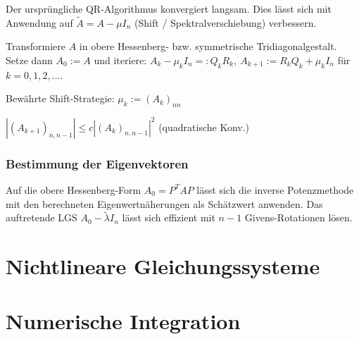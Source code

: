 Der ursprüngliche QR-Algorithmus konvergiert langsam. Dies lässt sich mit Anwendung auf $\tilde A = A - \mu I_n$ (Shift / Spektralverschiebung) verbessern.

\spacing

Transformiere $A$ in obere Hessenberg- bzw. symmetrische Tridiagonalgestalt. Setze dann $A_0 := A$ und iteriere: $A_k - \mu_k I_n =: Q_kR_k, \ A_{k+1} := R_kQ_k + \mu_k I_n$ für $k = 0,1,2,\dots$.

\spacing

Bewährte Shift-Strategie: $\mu_k := (A_k)_{nn}$

$|(A_{k+1})_{n,n-1}| \leq c |(A_k)_{n,n-1}|^2$ (quadratische Konv.)

\subsubsection*{Bestimmung der Eigenvektoren}

Auf die obere Hessenberg-Form $A_0 = P^T A P$ lässt sich die inverse Potenzmethode mit den berechneten Eigenwertnäherungen als Schätzwert anwenden. Das auftretende LGS $A_0 - \tilde\lambda I_n$ lässt sich effizient mit $n-1$ Givens-Rotationen lösen.

\section*{Nichtlineare Gleichungssysteme}

\section*{Numerische Integration}
